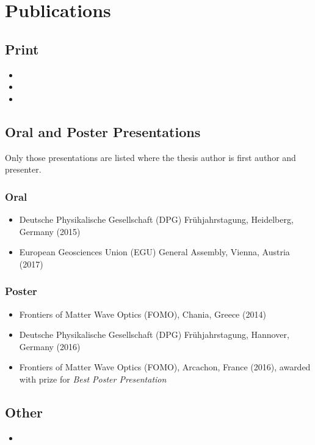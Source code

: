 \chapter*{Publications}\label{app:publications}

\begin{refsection}
	
	\section*{Print}
	\begin{itemize}
		\item {}
		\item {}
		\item {}
	\end{itemize}
	
	\section*{Oral and Poster Presentations}
	Only those presentations are listed where the thesis author is first author and presenter.
	\subsection*{Oral}
	\begin{itemize}
		\item Deutsche Physikalische Gesellschaft (DPG) Frühjahrstagung, Heidelberg, Germany (2015)
		\item European Geosciences Union (EGU) General Assembly, Vienna, Austria (2017)
	\end{itemize}
	\subsection*{Poster}
	\begin{itemize}
		\item Frontiers of Matter Wave Optics (FOMO), Chania, Greece (2014)
		\item Deutsche Physikalische Gesellschaft (DPG) Frühjahrstagung, Hannover, Germany (2016)
		\item Frontiers of Matter Wave Optics (FOMO), Arcachon, France (2016), awarded with prize for \emph{Best Poster Presentation}
	\end{itemize}
	
	\section*{Other}
	\begin{itemize}
		\item {}
	\end{itemize}
	
\end{refsection}